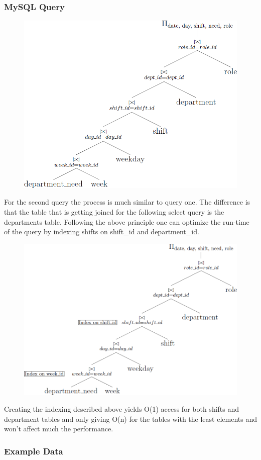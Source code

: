 \documentclass[letter,12pt]{texMemo}
\begin{document}
\subsubsection*{MySQL Query}
	
\begin{figure}[H]
	\centering
	\includegraphics[width=.75\textwidth]{query2.png}
\end{figure}
For the second query the process is much similar to query one. The difference is that the table that is getting joined for the following select query is the departments table. Following the above principle one can optimize the run-time of the query by indexing shifts on shift\_id and department\_id. 
\begin{figure}[H]
	\centering
	\includegraphics[width=.75\textwidth]{query2_indexed.png}
\end{figure}
Creating the indexing described above yields O(1) access for both shifts and department tables and only giving O(n) for the tables with the least elements and won't affect much the performance.
\vspace{1em}
\subsubsection*{Example Data}
\begin{changemargin}{-1.25cm}{-1.25cm}
	\begin{center}
		
	\end{center}
\end{changemargin}
\end{document}
